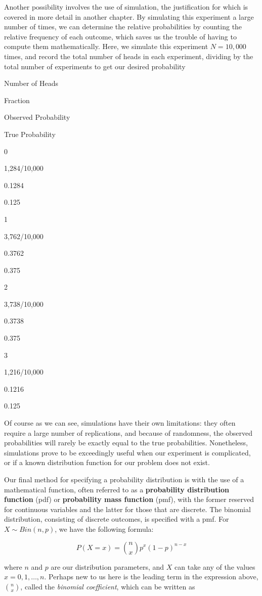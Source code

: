 \documentclass[
]{book}
\theoremstyle{definition}
\theoremstyle{definition}
\theoremstyle{definition}
\theoremstyle{remark}
\begin{document}
Another possibility involves the use of simulation, the justification for which is covered in more detail in another chapter. By simulating this experiment a large number of times, we can determine the relative probabilities by counting the relative frequency of each outcome, which saves us the trouble of having to compute them mathematically. Here, we simulate this experiment \(N = 10,000\) times, and record the total number of heads in each experiment, dividing by the total number of experiments to get our desired probability

Number of Heads

Fraction

Observed Probability

True Probability

0

1,284/10,000

0.1284

0.125

1

3,762/10,000

0.3762

0.375

2

3,738/10,000

0.3738

0.375

3

1,216/10,000

0.1216

0.125

Of course as we can see, simulations have their own limitations: they often require a large number of replications, and because of randomness, the observed probabilities will rarely be exactly equal to the true probabilities. Nonetheless, simulations prove to be exceedingly useful when our experiment is complicated, or if a known distribution function for our problem does not exist.

Our final method for specifying a probability distribution is with the use of a mathematical function, often referred to as a \textbf{probability distribution function} (pdf) or \textbf{probability mass function} (pmf), with the former reserved for continuous variables and the latter for those that are discrete. The binomial distribution, consisting of discrete outcomes, is specified with a pmf. For \(X \sim Bin(n, p)\), we have the following formula:

\[
P(X = x) = \binom{n}{x} p^x (1-p)^{n-x}
\]

where \(n\) and \(p\) are our distribution parameters, and \(X\) can take any of the values \(x = 0, 1, \dots, n\). Perhaps new to us here is the leading term in the expression above, \(\binom{n}{x}\), called the \emph{binomial coefficient}, which can be written as
\end{document}
